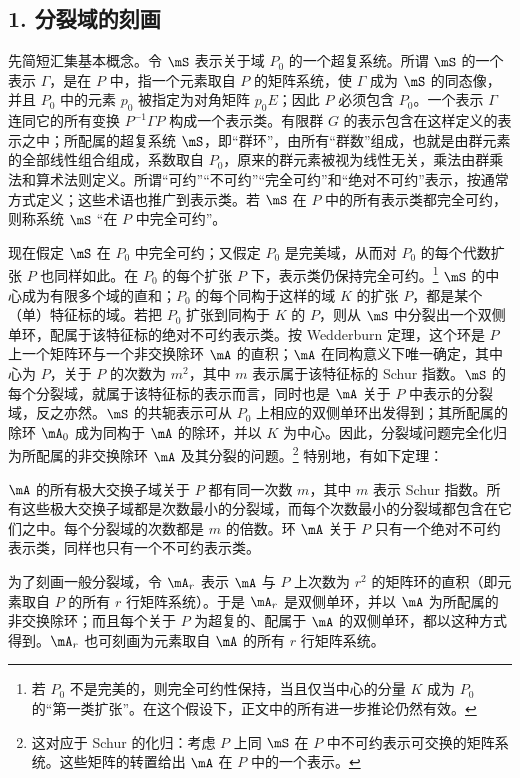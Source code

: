 \subsection*{1. 分裂域的刻画}

先简短汇集基本概念。令 $\mS$ 表示关于域 $P_0$ 的一个超复系统。所谓 $\mS$ 的一个表示 $\Gamma$，是在 $P$ 中，指一个元素取自 $P$ 的矩阵系统，使 $\Gamma$ 成为 $\mS$ 的同态像，并且 $P_0$ 中的元素 $p_0$ 被指定为对角矩阵 $p_0E$；因此 $P$ 必须包含 $P_0$。一个表示 $\Gamma$ 连同它的所有变换 $P^{-1}\Gamma P$ 构成一个表示类。有限群 $G$ 的表示包含在这样定义的表示之中；所配属的超复系统 $\mS$，即“群环”，由所有“群数”组成，也就是由群元素的全部线性组合组成，系数取自 $P_0$，原来的群元素被视为线性无关，乘法由群乘法和算术法则定义。所谓“可约”“不可约”“完全可约”和“绝对不可约”表示，按通常方式定义；这些术语也推广到表示类。若 $\mS$ 在 $P$ 中的所有表示类都完全可约，则称系统 $\mS$ “在 $P$ 中完全可约”。

现在假定 $\mS$ 在 $P_0$ 中完全可约；又假定 $P_0$ 是完美域，从而对 $P_0$ 的每个代数扩张 $P$ 也同样如此。在 $P_0$ 的每个扩张 $P$ 下，表示类仍保持完全可约。\footnote{若 $P_0$ 不是完美的，则完全可约性保持，当且仅当中心的分量 $K$ 成为 $P_0$ 的“第一类扩张”。在这个假设下，正文中的所有进一步推论仍然有效。} $\mS$ 的中心成为有限多个域的直和；$P_0$ 的每个同构于这样的域 $K$ 的扩张 $P$，都是某个（单）特征标的域。若把 $P_0$ 扩张到同构于 $K$ 的 $P$，则从 $\mS$ 中分裂出一个双侧单环，配属于该特征标的绝对不可约表示类。按 Wedderburn 定理，这个环是 $P$ 上一个矩阵环与一个非交换除环 $\mA$ 的直积；$\mA$ 在同构意义下唯一确定，其中心为 $P$，关于 $P$ 的次数为 $m^2$，其中 $m$ 表示属于该特征标的 Schur 指数。$\mS$ 的每个分裂域，就属于该特征标的表示而言，同时也是 $\mA$ 关于 $P$ 中表示的分裂域，反之亦然。$\mS$ 的共轭表示可从 $P_0$ 上相应的双侧单环出发得到；其所配属的除环 $\mA_0$ 成为同构于 $\mA$ 的除环，并以 $K$ 为中心。因此，分裂域问题完全化归为所配属的非交换除环 $\mA$ 及其分裂的问题。\footnote{这对应于 Schur 的化归：考虑 $P$ 上同 $\mS$ 在 $P$ 中不可约表示可交换的矩阵系统。这些矩阵的转置给出 $\mA$ 在 $P$ 中的一个表示。} 特别地，有如下定理：

$\mA$ 的所有极大交换子域关于 $P$ 都有同一次数 $m$，其中 $m$ 表示 Schur 指数。所有这些极大交换子域都是次数最小的分裂域，而每个次数最小的分裂域都包含在它们之中。每个分裂域的次数都是 $m$ 的倍数。环 $\mA$ 关于 $P$ 只有一个绝对不可约表示类，同样也只有一个不可约表示类。

为了刻画一般分裂域，令 $\mA_r$ 表示 $\mA$ 与 $P$ 上次数为 $r^2$ 的矩阵环的直积（即元素取自 $P$ 的所有 $r$ 行矩阵系统）。于是 $\mA_r$ 是双侧单环，并以 $\mA$ 为所配属的非交换除环；而且每个关于 $P$ 为超复的、配属于 $\mA$ 的双侧单环，都以这种方式得到。$\mA_r$ 也可刻画为元素取自 $\mA$ 的所有 $r$ 行矩阵系统。


